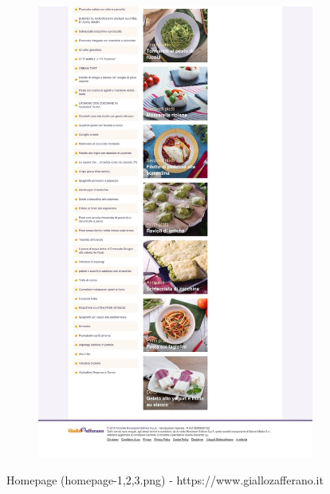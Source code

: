 \begin{figure}[h!]
\begin{subfigure}[b]{0.3\textwidth}
		\includegraphics[scale=0.1]{images/homepage/homepage-3.jpeg}
		\subcaption{}
	\end{subfigure}
	\caption{Homepage (homepage-1,2,3.png) - https://www.giallozafferano.it}
	\label{fig:homepage}
\end{figure}


